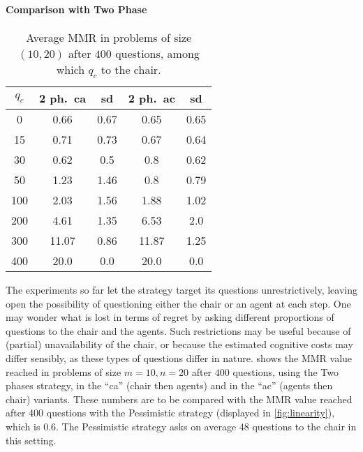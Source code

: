 \documentclass{article}
\begin{document}
\paragraph{Comparison with Two Phase}
\begin{table}
	\caption{Average MMR in problems of size $(10, 20)$ after $400$ questions, among which $q_c$ to the chair.}
	\label{tab:twoP400}
	\begin{tabular}{S[table-figures-integer=3, table-figures-decimal=0]S[table-number-alignment = right]@{ ± }S[table-number-alignment = left, table-figures-integer=1]S[table-number-alignment = right]@{ ± }S[table-number-alignment = left, table-figures-integer=1]}
		\toprule
		{$q_c$} & {2 ph.\ ca} & {sd} & {2 ph.\ ac} & {sd} \\
		 & 0.66 & 0.67 & 0.65 & 0.65  \\
		15 & 0.71 & 0.73 & 0.67	& 0.64 \\
		30 & 0.62 & 0.5 & 0.8 & 0.62 \\
		50 & 1.23 & 1.46 & 0.8 & 0.79 \\
		100 & 2.03 & 1.56 & 1.88 & 1.02  \\
		200 & 4.61	& 1.35  & 6.53 & 2.0  \\
		300 &11.07 & 0.86& 11.87 & 1.25 \\
		400 &20.0 & 0.0 & 20.0 & 0.0 \\
		\bottomrule
	\end{tabular}
\end{table}

The experiments so far let the strategy target its questions unrestrictively, leaving open the possibility of questioning either the chair or an agent at each step. One may wonder what is lost in terms of regret by asking different proportions of questions to the chair and the agents. Such restrictions may be useful because of (partial) unavailability of the chair, or because the estimated cognitive costs may differ sensibly, as these types of questions differ in nature. 
 shows the MMR value reached in problems of size $m = 10, n = 20$ after $400$ questions, using the Two phases strategy, in the “ca” (chair then agents) and in the “ac” (agents then chair) variants. These numbers are to be compared with the MMR value reached after 400 questions with the Pessimistic strategy (displayed in \cref{fig:linearity}), which is $0.6$.
The Pessimistic strategy asks on average $48$ questions to the chair in this setting.
\end{document}

